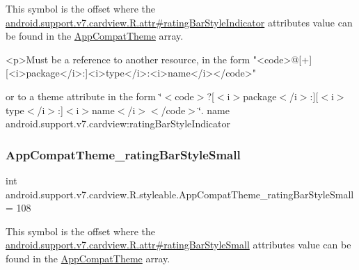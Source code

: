 This symbol is the offset where the \hyperlink{classandroid_1_1support_1_1v7_1_1cardview_1_1R_1_1attr_a5b7894890d0ccca978ea0fc38f92c66e}{android.\+support.\+v7.\+cardview.\+R.\+attr\#rating\+Bar\+Style\+Indicator} attribute\textquotesingle{}s value can be found in the \hyperlink{classandroid_1_1support_1_1v7_1_1cardview_1_1R_1_1styleable_a52e6f69f954ecc2622d72c0b4d298938}{App\+Compat\+Theme} array.

\begin{DoxyVerb}      <p>Must be a reference to another resource, in the form "<code>@[+][<i>package</i>:]<i>type</i>:<i>name</i></code>"
\end{DoxyVerb}
 or to a theme attribute in the form \char`\"{}$<$code$>$?\mbox{[}$<$i$>$package$<$/i$>$\+:\mbox{]}\mbox{[}$<$i$>$type$<$/i$>$\+:\mbox{]}$<$i$>$name$<$/i$>$$<$/code$>$\char`\"{}.  name android.\+support.\+v7.\+cardview\+:rating\+Bar\+Style\+Indicator \mbox{\label{classandroid_1_1support_1_1v7_1_1cardview_1_1R_1_1styleable_af7fad53bb6f6481db350fa6bf3d2f4be}} 
\subsubsection{\texorpdfstring{App\+Compat\+Theme\+\_\+rating\+Bar\+Style\+Small}{AppCompatTheme\_ratingBarStyleSmall}}
{\footnotesize\ttfamily int android.\+support.\+v7.\+cardview.\+R.\+styleable.\+App\+Compat\+Theme\+\_\+rating\+Bar\+Style\+Small = 108\hspace{0.3cm}{\ttfamily [static]}}

This symbol is the offset where the \hyperlink{classandroid_1_1support_1_1v7_1_1cardview_1_1R_1_1attr_afa8d9e5d9fb40c29dc437120e60494a8}{android.\+support.\+v7.\+cardview.\+R.\+attr\#rating\+Bar\+Style\+Small} attribute\textquotesingle{}s value can be found in the \hyperlink{classandroid_1_1support_1_1v7_1_1cardview_1_1R_1_1styleable_a52e6f69f954ecc2622d72c0b4d298938}{App\+Compat\+Theme} array.

